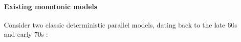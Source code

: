 

\paragraph{Existing monotonic models}

Consider two classic deterministic parallel models,
dating back to the late 60s and early 70s \cite{Tesler-1968,kahn-1974}:



